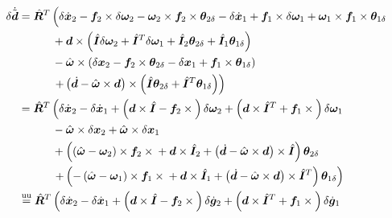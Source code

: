 \documentclass[10pt,dvips,fleqn,subeqn]{report}
\newcommand{\T}[1]{\bm{#1}}
\newcommand{\TT}[1]{\bm{#1}}
\newcommand{\equu}{\overset{\text{uu}}{=}}
\begin{document}
\begin{align}
	\delta\dot{\tilde{\T{d}}}
	&=
	\hat{\TT{R}}^T \lplbr{ \vphantom{\plbr{\hat{\TT{I}}^T}}
		\delta\dot{\T{x}}_2
		- \T{f}_2 \times \delta\T{\omega}_{2}
		- \T{\omega}_{2} \times \T{f}_2 \times \T{\theta}_{2\delta}
		- \delta\dot{\T{x}}_1
		+ \T{f}_1 \times \delta\T{\omega}_{1}
		+ \T{\omega}_{1} \times \T{f}_1 \times \T{\theta}_{1\delta}
	} \nonumber \\
	& \quad\quad\quad
	 	+ \T{d}\times\plbr{
			\hat{\TT{I}} \delta\T{\omega}_2
			+ \hat{\TT{I}}^T \delta\T{\omega}_1
			+ \hat{\TT{I}}_2 \T{\theta}_{2\delta}
			+ \hat{\TT{I}}_1 \T{\theta}_{1\delta}
		}
	\nonumber \\
	& \quad\quad\quad
		- \hat{\T{\omega}}\times\plbr{
			\delta\T{x}_2
			- \T{f}_2\times\T{\theta}_{2\delta}
			- \delta\T{x}_1
			+ \T{f}_1\times\T{\theta}_{1\delta}
		}
	\nonumber \\
	& \quad\quad\quad
	\rplbr{
		+ \plbr{
			\dot{\T{d}} - \hat{\T{\omega}}\times\T{d}
		} \times \plbr{
			\hat{\TT{I}} \T{\theta}_{2\delta}
			+ \hat{\TT{I}}^T \T{\theta}_{1\delta}
		}
	}
	\nonumber \\
	&=
	\hat{\TT{R}}^T \lplbr{ \vphantom{\plbr{\hat{\TT{I}}^T}}
		\delta\dot{\T{x}}_2
		- \delta\dot{\T{x}}_1
		+ \plbr{
			\T{d}\times\hat{\TT{I}}
			- \T{f}_2\times{}
		} \delta\T{\omega}_2
		+ \plbr{
			\T{d}\times\hat{\TT{I}}^T
			+ \T{f}_1\times{}
		} \delta\T{\omega}_1
	}
	\nonumber \\
	& \quad\quad\quad
		- \hat{\T{\omega}}\times\delta\T{x}_2
		+ \hat{\T{\omega}}\times\delta\T{x}_1
	\nonumber \\
	& \quad\quad\quad
		+ \plbr{
			\plbr{
				\hat{\T{\omega}}
				- \T{\omega}_2
			}\times\T{f}_2\times{}
			+ \T{d}\times\hat{\TT{I}}_2
			+ \plbr{
				\dot{\T{d}}
				- \hat{\T{\omega}}\times\T{d}
			}\times\hat{\TT{I}}
		} \T{\theta}_{2\delta}
	\nonumber \\
	& \quad\quad\quad
	\rplbr{
		+ \plbr{
			- \plbr{
				\hat{\T{\omega}}
				- \T{\omega}_1
			}\times\T{f}_1\times{}
			+ \T{d}\times\hat{\TT{I}}_1
			+ \plbr{
				\dot{\T{d}}
				- \hat{\T{\omega}}\times\T{d}
			}\times\hat{\TT{I}}^T
		} \T{\theta}_{1\delta}
	}
	\nonumber \\
	&\equu
	\hat{\TT{R}}^T \lplbr{ \vphantom{\plbr{\hat{\TT{I}}^T}}
		\delta\dot{\T{x}}_2
		- \delta\dot{\T{x}}_1
		+ \plbr{
			\T{d}\times\hat{\TT{I}}
			- \T{f}_2\times{}
		} \delta\dot{\T{g}}_2
		+ \plbr{
			\T{d}\times\hat{\TT{I}}^T
			+ \T{f}_1\times{}
		} \delta\dot{\T{g}}_1
	}
	\nonumber \\

\end{align}
\end{document}
